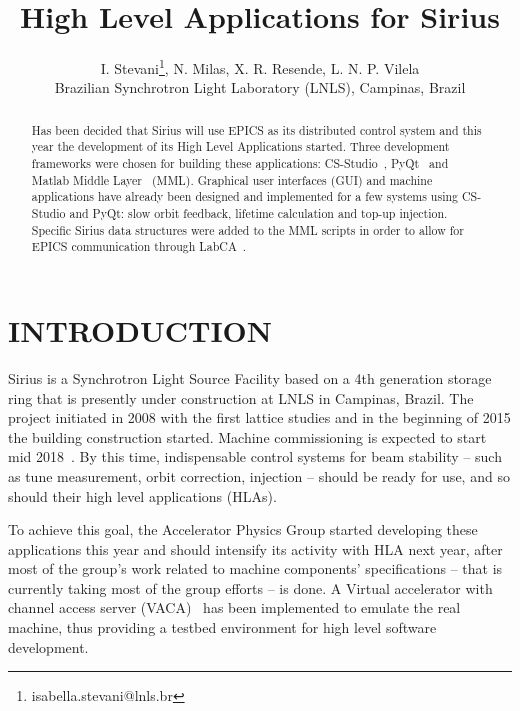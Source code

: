 \documentclass[a4paper,
              ]{jacow}
\begin{document}
\title{High Level Applications for Sirius}

\author{I. Stevani\thanks{isabella.stevani@lnls.br}, N. Milas, X. R. Resende, L. N. P. Vilela\\ Brazilian Synchrotron Light Laboratory (LNLS), Campinas, Brazil}
	
\maketitle

%
\begin{abstract}
   Has been decided that Sirius will use EPICS as its distributed control system and this year the development of its High Level Applications started. Three development frameworks were chosen for building these applications: CS-Studio~\cite{css}, PyQt~\cite{pyqt} and Matlab Middle Layer~\cite{mml} (MML). Graphical user interfaces (GUI) and machine applications have already been designed and implemented for a few systems using CS-Studio and PyQt: slow orbit feedback, lifetime calculation and top-up injection. Specific Sirius data structures were added to the MML scripts in order to allow for EPICS communication through LabCA~\cite{labca}.
\end{abstract}


\section{INTRODUCTION}
Sirius is a Synchrotron Light Source Facility based on a 4th generation storage ring that is presently under construction at LNLS in Campinas, Brazil. The project initiated in 2008 with the first lattice studies and in the beginning of 2015 the building construction started. Machine commissioning is expected to start mid 2018~\cite{sirius_status}. By this time, indispensable control systems for beam stability -- such as tune measurement, orbit correction, injection -- should be ready for use, and so should their high level applications (HLAs).

To achieve this goal, the Accelerator Physics Group started developing these applications this year and should intensify its activity with HLA next year, after most of the group's work related to machine components' specifications -- that is currently taking most of the group efforts -- is done. A Virtual accelerator with channel access server (VACA)~\cite{vaca} has been implemented to emulate the real machine, thus providing a testbed environment for high level software development.
\end{document}

